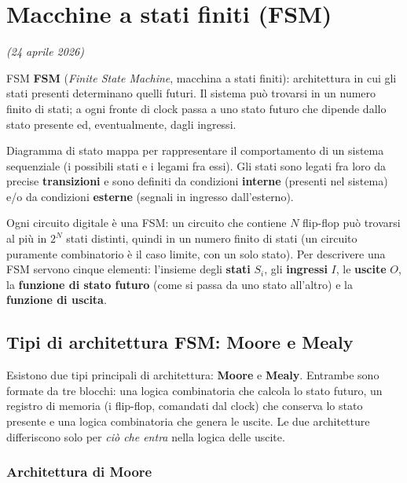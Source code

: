 \chapter{Macchine a stati finiti (FSM)}
\label{ch:fsm}
\textit{(24 aprile 2026)}

\begin{definizione}{FSM}
\textbf{FSM} (\emph{Finite State Machine}, macchina a stati finiti): architettura in cui gli
stati presenti determinano quelli futuri. Il sistema può trovarsi in un numero finito di
stati; a ogni fronte di clock passa a uno stato futuro che dipende dallo stato presente ed,
eventualmente, dagli ingressi.
\end{definizione}

\begin{definizione}{Diagramma di stato}
mappa per rappresentare il comportamento di un sistema sequenziale (i possibili stati e i
legami fra essi). Gli stati sono legati fra loro da precise \textbf{transizioni} e sono
definiti da condizioni \textbf{interne} (presenti nel sistema) e/o da condizioni
\textbf{esterne} (segnali in ingresso dall'esterno).
\end{definizione}

\noindent Ogni circuito digitale è una FSM: un circuito che contiene $N$ flip-flop può
trovarsi al più in $2^N$ stati distinti, quindi in un numero finito di stati (un circuito
puramente combinatorio è il caso limite, con un solo stato). Per descrivere una FSM
servono cinque elementi: l'insieme degli \textbf{stati} $S_i$, gli \textbf{ingressi} $I$,
le \textbf{uscite} $O$, la \textbf{funzione di stato futuro} (come si passa da uno stato
all'altro) e la \textbf{funzione di uscita}.

\section{Tipi di architettura FSM: Moore e Mealy}

Esistono due tipi principali di architettura: \textbf{Moore} e \textbf{Mealy}. Entrambe
sono formate da tre blocchi: una logica combinatoria che calcola lo stato futuro, un
registro di memoria (i flip-flop, comandati dal clock) che conserva lo stato presente e una
logica combinatoria che genera le uscite. Le due architetture differiscono solo per
\emph{ciò che entra} nella logica delle uscite.

\subsection{Architettura di Moore}

